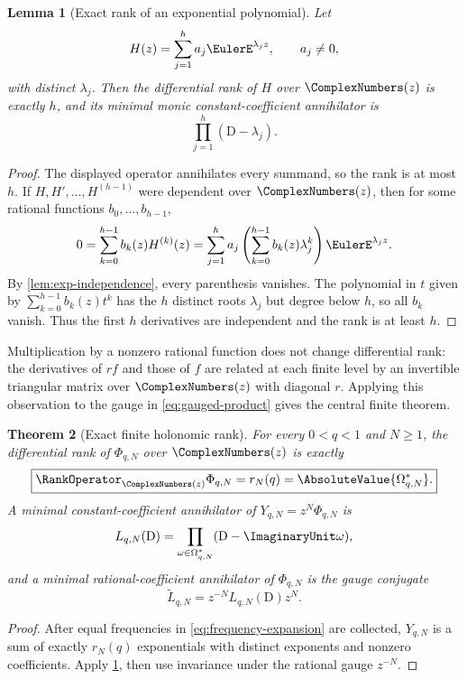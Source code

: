 \documentclass[11pt]{article}
\numberwithin{equation}{section}
\newtheorem{theorem}{Theorem}[section]
\newtheorem{lemma}[theorem]{Lemma}
\theoremstyle{definition}
\theoremstyle{remark}
\newcommand{\D}{\mathrm D}
\begin{document}
\begin{lemma}[Exact rank of an exponential polynomial]
\label{lem:exp-rank}
Let
\[
 H(z)=\sum_{j=1}^{h}a_j\EulerE^{\lambda_jz},
 \qquad a_j\ne0,
\]
with distinct $\lambda_j$.  Then the differential rank of $H$ over $\ComplexNumbers(z)$ is
exactly $h$, and its minimal monic constant-coefficient annihilator is
\begin{equation}
 \prod_{j=1}^{h}(\D-\lambda_j).
 \label{eq:min-exp-operator}
\end{equation}
\end{lemma}
\begin{proof}
The displayed operator annihilates every summand, so the rank is at most $h$.
If $H,H',\ldots,H^{(h-1)}$ were dependent over $\ComplexNumbers(z)$, then for some rational
functions $b_0,\ldots,b_{h-1}$,
\[
 0=\sum_{k=0}^{h-1}b_k(z)H^{(k)}(z)
  =\sum_{j=1}^{h}a_j
    \left(\sum_{k=0}^{h-1}b_k(z)\lambda_j^k\right)\EulerE^{\lambda_jz}.
\]
By \cref{lem:exp-independence}, every parenthesis vanishes.  The polynomial in
$t$ given by $\sum_{k=0}^{h-1}b_k(z)t^k$ has the $h$ distinct roots
$\lambda_j$ but degree below $h$, so all $b_k$ vanish.  Thus the first $h$
derivatives are independent and the rank is at least $h$.
\end{proof}

Multiplication by a nonzero rational function does not change differential
rank: the derivatives of $rf$ and those of $f$ are related at each finite level
by an invertible triangular matrix over $\ComplexNumbers(z)$ with diagonal $r$.  Applying
this observation to the gauge in \eqref{eq:gauged-product} gives the central
finite theorem.

\begin{theorem}[Exact finite holonomic rank]
\label{thm:finite-rank}
For every $0<q<1$ and $N\ge1$, the differential rank of
$\Phi_{q,N}$ over $\ComplexNumbers(z)$ is exactly
\begin{equation}
 \boxed{\RankOperator_{\ComplexNumbers(z)}\Phi_{q,N}=r_N(q)=\AbsoluteValue{\Omega^*_{q,N}}.}
 \label{eq:rank-support}
\end{equation}
A minimal constant-coefficient annihilator of $Y_{q,N}=z^N\Phi_{q,N}$ is
\begin{equation}
 L_{q,N}(\D)=\prod_{\omega\in\Omega^*_{q,N}}(\D-\ImaginaryUnit\omega),
 \label{eq:minimal-LqN}
\end{equation}
and a minimal rational-coefficient annihilator of $\Phi_{q,N}$ is the gauge
conjugate
\begin{equation}
 \widetilde L_{q,N}=z^{-N}L_{q,N}(\D)z^N.
 \label{eq:gauge-conjugate}
\end{equation}
\end{theorem}
\begin{proof}
After equal frequencies in \eqref{eq:frequency-expansion} are collected,
$Y_{q,N}$ is a sum of exactly $r_N(q)$ exponentials with distinct exponents and
nonzero coefficients.  Apply \cref{lem:exp-rank}, then use invariance under the
rational gauge $z^{-N}$.
\end{proof}
\end{document}

